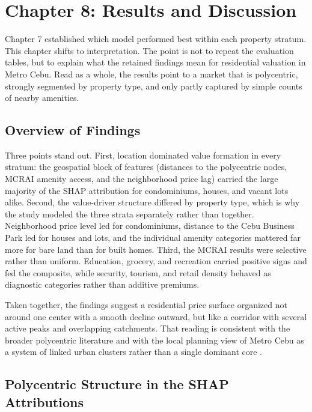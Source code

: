 \section{Chapter 8: Results and Discussion}\label{results-and-discussion}

Chapter 7 established which model performed best within each property stratum. This chapter shifts to interpretation. The point is not to repeat the evaluation tables, but to explain what the retained findings mean for residential valuation in Metro Cebu. Read as a whole, the results point to a market that is polycentric, strongly segmented by property type, and only partly captured by simple counts of nearby amenities.

\subsection{Overview of Findings}\label{overview-of-findings}

Three points stand out. First, location dominated value formation in every stratum: the geospatial block of features (distances to the polycentric nodes, MCRAI amenity access, and the neighborhood price lag) carried the large majority of the SHAP attribution for condominiums, houses, and vacant lots alike. Second, the value-driver structure differed by property type, which is why the study modeled the three strata separately rather than together. Neighborhood price level led for condominiums, distance to the Cebu Business Park led for houses and lots, and the individual amenity categories mattered far more for bare land than for built homes. Third, the MCRAI results were selective rather than uniform. Education, grocery, and recreation carried positive signs and fed the composite, while security, tourism, and retail density behaved as diagnostic categories rather than additive premiums.

Taken together, the findings suggest a residential price surface organized not around one center with a smooth decline outward, but like a corridor with several active peaks and overlapping catchments. That reading is consistent with the broader polycentric literature and with the local planning view of Metro Cebu as a system of linked urban clusters rather than a single dominant core \parencite{giuliano1991subcenters,mcmillen2003employment,heikkila1989cbd,jica2015metrocebu}.

\subsection{Polycentric Structure in the SHAP Attributions}\label{polycentric-structure-in-the-shap-top-features}

